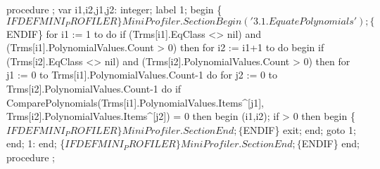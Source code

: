 \nwenddocs{}\endmoddef\nwstartdeflinemarkup\nwenddeflinemarkup
procedure ;
var
   i1,i2,j1,j2: integer;
label 1;
begin
   \{$IFDEF MINI_PROFILER\}
   MiniProfiler.SectionBegin ('3.1. EquatePolynomials');
   \{$ENDIF\}
   for i1 := 1 to  do
      if (Trms[i1].EqClass <> nil) and (Trms[i1].PolynomialValues.Count > 0) then
         for i2 := i1+1 to  do
         begin
            if (Trms[i2].EqClass <> nil) and (Trms[i2].PolynomialValues.Count > 0) then
               for j1 := 0 to Trms[i1].PolynomialValues.Count-1 do
                  for j2 := 0 to Trms[i2].PolynomialValues.Count-1 do
                     if ComparePolynomials(Trms[i1].PolynomialValues.Items^[j1],
                                           Trms[i2].PolynomialValues.Items^[j2]) = 0 then
                     begin
                        (i1,i2);
                        if  > 0 then
                        begin
                           \{$IFDEF MINI_PROFILER\}
                           MiniProfiler.SectionEnd;
                           \{$ENDIF\}
                           exit;
                        end;
                        goto 1;
                     end;
            1:
         end;
   \{$IFDEF MINI_PROFILER\}
   MiniProfiler.SectionEnd;
   \{$ENDIF\}
end;
\eatline
{}\nwendcode{}\nwdocspar
\nwenddocs{}\endmoddef\nwstartdeflinemarkup\nwenddeflinemarkup
procedure ;
